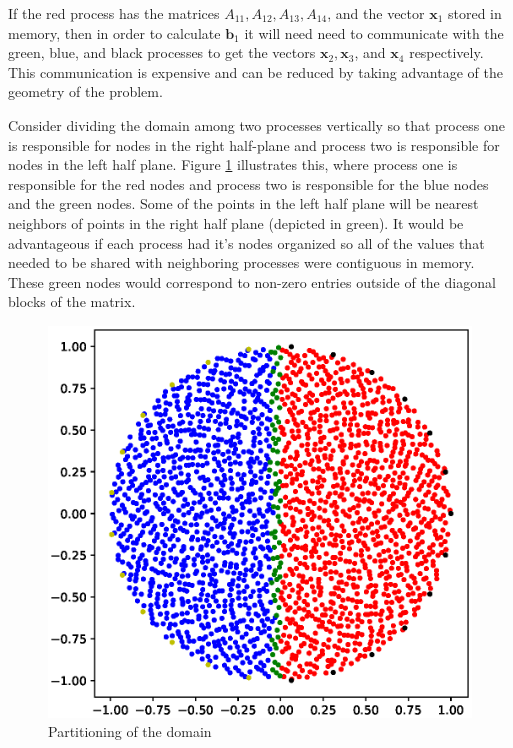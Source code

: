 \documentclass[12pt]{article}
\let\vec\mathbf
\begin{document}




If the red process has the matrices $A_{11}, A_{12}, A_{13}, A_{14}$, and the vector $\vec{x}_1$ stored in memory, then in order to calculate $\vec{b}_1$ it will need need to communicate with the green, blue, and black processes to get the vectors $\vec{x}_2, \vec{x}_3$, and $\vec{x}_4$ respectively. This communication is expensive and can be reduced by taking advantage of the geometry of the problem.

Consider dividing the domain among two processes vertically so that process one is responsible for nodes in the right half-plane and process two is responsible for nodes in the left half plane. Figure \ref{dsik_two_proc} illustrates this, where process one is responsible for the red nodes and process two is responsible for the blue nodes and the green nodes. Some of the points in the left half plane will be nearest neighbors of points in the right half plane (depicted in green). It would be advantageous if each process had it's nodes organized so all of the values that needed to be shared with neighboring processes were contiguous in memory. These green nodes would correspond to non-zero entries outside of the diagonal blocks of the matrix.

\begin{figure}[!htbp]
	\centering
	\includegraphics[width=.5\textwidth]{nearest_2proc_disk.eps}
	\caption{Partitioning of the domain }
	\label{dsik_two_proc}
\end{figure}
\end{document}
